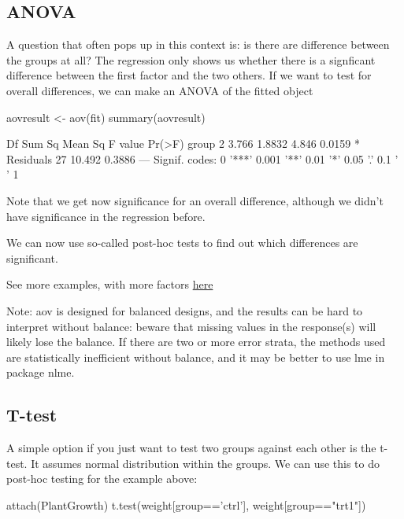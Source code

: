 \documentclass[a4paper,twoside]{tufte-book}\usepackage[]{graphicx}\usepackage[]{color}
\begin{document}
\begin{appendices}
\subsection{ANOVA}

A question that often pops up in this context is: is there are difference between the groups at all? The regression only shows us whether there is a signficant difference between the first factor and the two others. If we want to test for overall differences, we can make an ANOVA of the fitted object

\begin{Schunk}
\begin{Sinput}
aovresult <- aov(fit)
summary(aovresult)
\end{Sinput}
\begin{Soutput}
            Df Sum Sq Mean Sq F value Pr(>F)  
group        2  3.766  1.8832   4.846 0.0159 *
Residuals   27 10.492  0.3886                 
---
Signif. codes:  0 '***' 0.001 '**' 0.01 '*' 0.05 '.' 0.1 ' ' 1
\end{Soutput}
\end{Schunk}

Note that we get now significance for an overall difference, although we didn't have significance in the regression before. 

We can now use so-called post-hoc tests to find out which differences are significant.

See more examples, with more factors \href{http://www.statmethods.net/stats/anova.html}{here} 

Note: aov is designed for balanced designs, and the results can be hard to interpret without balance: beware that missing values in the response(s) will likely lose the balance. If there are two or more error strata, the methods used are statistically inefficient without balance, and it may be better to use lme in package nlme.

\subsection{T-test}

A simple option if you just want to test two groups against each other is the t-test. It assumes normal distribution within the groups. We can use this to do post-hoc testing for the example above: 

\begin{Schunk}
\begin{Sinput}
attach(PlantGrowth)
t.test(weight[group=='ctrl'], weight[group=="trt1"])
\end{Sinput}
\begin{Soutput}


\end{Soutput}
\end{Schunk}
\end{appendices}
\end{document}
